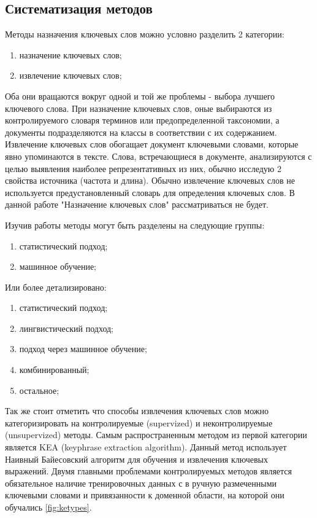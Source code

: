 \subsection{Систематизация методов}


Методы назначения ключевых слов можно условно разделить 2 категории:
\begin{enumerate}
	\item назначение ключевых слов;
	\item извлечение ключевых слов;
\end{enumerate}

Оба они вращаются вокруг одной и той же проблемы - выбора лучшего ключевого слова.
При назначение ключевых слов, оные выбираются из контролируемого словаря терминов или предопределенной таксономии, а документы подразделяются на классы в соответствии с их содержанием.
Извлечение ключевых слов обогащает документ ключевыми словами, которые явно упоминаются в тексте.
Слова, встречающиеся в документе, анализируются с целью выявления наиболее репрезентативных из них, обычно исследую 2 свойства источника (частота и длина).
Обычно извлечение ключевых слов не используется предустановленный словарь для определения ключевых слов.
В данной работе "Назначение ключевых слов" рассматриваться не будет.

Изучив работы \cite{8} методы могут быть разделены на следующие группы:
\begin{enumerate}
	\item статистический подход;
	\item машинное обучение;
\end{enumerate}
Или более детализировано:
\begin{enumerate}
	\item статистический подход;
	\item лингвистический подход;
	\item подход через машинное обучение;
	\item комбинированный;
	\item остальное;
\end{enumerate}

Так же стоит отметить что способы извлечения ключевых слов можно категоризировать на контролируемые (supervized) и неконтролируемые (unsupervized) методы.
Самым распространенным методом из первой категории является KEA (keyphrase extraction algorithm).
Данный метод использует Наивный Байесовский алгоритм для обучения и извлечения ключевых выражений.
Двумя главными проблемами контролируемых методов является обязательное наличие тренировочных данных с в ручную размеченными ключевыми словами и привязанности к доменной области, на которой они обучались \ref{fig:ketypes}.

